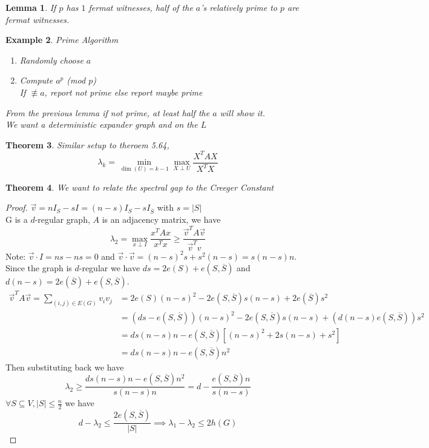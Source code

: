 \documentclass[a4paper]{article}
\newtheorem{thm}{Theorem}[section]
\newtheorem{lem}[thm]{Lemma}
\newtheorem{eg}[thm]{Example}
\begin{document}
\begin{lem}
    If $p$ has $1$ fermat witnesses, half of the $a$'s relatively prime to $p$ are fermat witnesses. 
\end{lem}
\begin{eg}
    Prime Algorithm
    \begin{enumerate}
        \item Randomly choose $a$
        \item Compute $a^p$ (mod $p$)\\
        If $\not \equiv a$, report not prime else report maybe prime
    \end{enumerate}
    From the previous lemma if not prime, at least half the $a$ will show it.\\
    We want a deterministic expander graph and on the $L$ 
\end{eg}
\begin{thm}
    Similar setup to theroem 5.64, $$\lambda_k=\min_{\dim(U)=k-1}\max_{X\perp U}\frac{X^TAX}{X^TX}$$
\end{thm}
\begin{thm}
    We want to relate the spectral gap to the Creeger Constant
\end{thm}
\begin{proof}
    $\Vec{v}=nI_S-sI=(n-s)I_S-sI_{\overline{S}}$ with $s=|S|$\\
    G is a $d$-regular graph, $A$ is an adjacency matrix, we have $$\lambda_2=\max_{x\perp I}\frac{x^TAx}{x^Tx}\geq \frac{\Vec{v}^TA\Vec{v}}{\Vec{v}^Tv}$$
    Note: $\Vec{v}\cdot I=ns-ns=0$ and $\Vec{v}\cdot \Vec{v} = (n-s)^2s+s^2(n-s)=s(n-s)n$.\\
    Since the graph is $d$-regular we have $ds=2e(S)+e(S,\overline{S})$ and $d(n-s)=2e(\overline{S})+e(S,\overline{S})$.
    \begin{align*}
        \vec{v}^TA\vec{v}=\sum_{(i,j)\in E(G)}v_iv_j&=2e(S)(n-s)^2-2e(S,\overline{S})s(n-s)+2e(\overline{S})s^2\\
        &=(ds-e(S,\overline{S}))(n-s)^2-2e(S,\overline{S})s(n-s)+(d(n-s)e(S,\overline{S}))s^2\\
        &=ds(n-s)n-e(S,\overline{S})[(n-s)^2+2s(n-s)+s^2]\\
        &=ds(n-s)n-e(S,\overline{S})n^2
    \end{align*}
    Then substituting back we have $$\lambda_2\geq \frac{ds(n-s)n-e(S,\overline{S})n^2}{s(n-s)n}=d-\frac{e(S,\overline{S})n}{s(n-s)}$$
    $\forall S\subseteq V, |S|\leq \frac{n}{2}$ we have $$d-\lambda_2\leq \frac{2e(S,\overline{S})}{|S|}\implies \lambda_1-\lambda_2\leq 2h(G)$$
\end{proof}
\end{document}
